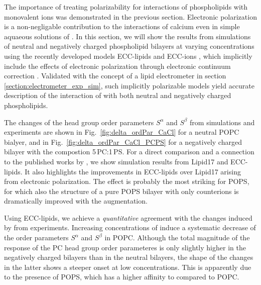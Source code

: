 The importance of treating polarizability for interactions of phospholipids with monovalent ions was demonstrated in the previous section. 
Electronic polarization is a non-negligable contribution to the interactions of calcium even in simple aquaeous solutions of  \citep{martinek17, kohagen16, Pluharova2014}. 
In this section,
we will show the results from simulations of neutral and negatively charged phospholipid bilayers at varying  concentrations
using the recently developed models ECC-lipids and ECC-ions \citep{melcr18, martinek17}, 
which implicitly include the effects of electronic polarization through electronic continuum correction \citep{leontyev11}. 
Validated with the concept of a lipid electrometer in section \ref{section:electrometer_exp_sim},
such implicitly polarizable models yield accurate description of 
the interaction of  with both neutral and negatively charged phospholipids. 

The changes of the head group order parameters $S^\alpha$ and $S^\beta$ from simulations and experiments 
are shown in Fig.~\ref{fig:delta_ordPar_CaCl} for a neutral POPC bialyer, 
and in Fig.~\ref{fig:delta_ordPar_CaCl_PCPS} for a negatively charged bilayer with the compostion 5\,PC:1\,PS. 
For a direct comparison and a connection to the published works by \citet{catte16, nmrlipids_proj4},
we show simulation results from Lipid17 \citep{lipid17-future} and ECC-lipids. 
It also highlights the improvements in ECC-lipids over Lipid17 arising from electronic polarization. 
The effect is probably the most striking for POPS, 
for which also the structure of a pure POPS bilayer with only counterions is dramatically improved with the augmentation. 


Using ECC-lipids, we achieve a \emph{quantitative} agreement with the changes induced by  from experiments. 
Increasing concentrations of  induce a systematic decrease of the order parameters $S^\alpha$ and $S^\beta$ in POPC. 
Although the total magnitude of the response of the PC head group order parameteres 
is only slightly higher in the negatively charged bilayers than in the neutral bilayers, 
the shape of the changes in the latter shows a steeper onset at low concentrations. 
This is apparently due to the presence of POPS, 
which has a higher affinity to  compared to POPC. 




